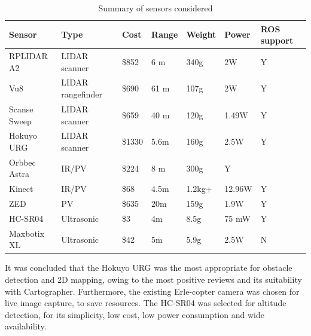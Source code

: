 \documentclass[capstone_report.tex]{subfiles}
\begin{document}
\begin{table}[H]
\centering
\begin{tabular}{lp{4cm}p{1cm}p{1cm}p{1cm}p{1cm}p{3cm}}
\toprule
  Sensor &Type&	Cost&Range&Weight&Power&ROS support\\
\midrule
RPLIDAR A2 &LIDAR scanner & \$852 &	6 m	&340g	&2W	&Y\\
Vu8	&LIDAR rangefinder	&\$690	&61 m	&107g	&2W	&Y\\
Scanse Sweep	&LIDAR scanner	&\$659	&40 m	&120g	&1.49W	&Y\\
Hokuyo URG	&LIDAR scanner	&\$1330	&5.6m	&160g	&2.5W	&Y\\
Orbbec Astra	&IR/PV	&\$224	&8 m	&300g	&Y\\
Kinect	&IR/PV	&\$68	&4.5m	&1.2kg+	&12.96W	&Y\\
ZED	&PV	&\$635	&20m	&159g	&1.9W	&Y\\
HC-SR04	&Ultrasonic	&\$3	&4m	&8.5g	&75 mW	&Y\\
Maxbotix XL	&Ultrasonic	&\$42	&5m	&5.9g	&2.5W	&N \\
\bottomrule
\end{tabular}
\caption{Summary of sensors considered\label{tab:sensorComp}}
\end{table}

It was concluded that the Hokuyo URG was the most appropriate for obstacle detection and 2D mapping, owing to the most positive reviews and its suitability with Cartographer. Furthermore, the existing Erle-copter camera was chosen for live image capture, to save resources. The HC-SR04 was selected for altitude detection, for its simplicity, low cost, low power consumption and wide availability.\\
\end{document}
